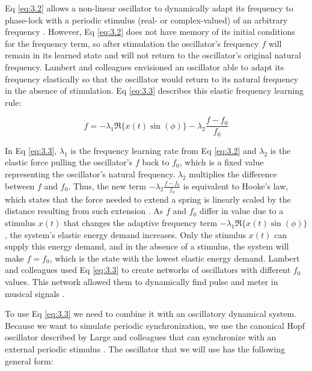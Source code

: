 \documentclass{report}
\begin{document}
Eq \eqref{eq:3.2} allows a non-linear oscillator to dynamically adapt its frequency to phase-lock with a periodic stimulus (real- or complex-valued) of an arbitrary frequency \cite{righetti2006dynamic}. However, Eq \eqref{eq:3.2} does not have memory of its initial conditions for the frequency term, so after stimulation the oscillator's frequency $f$ will remain in its learned state and will not return to the oscillator's original natural frequency. Lambert and colleagues \cite{lambert2016adaptive} envisioned an oscillator able to adapt its frequency elastically so that the oscillator would return to its natural frequency in the absence of stimulation. Eq \eqref{eq:3.3} describes this elastic frequency learning rule:

\begin{equation}
\dot{f} = -\lambda_1 \Re \{ x(t) \sin(\phi) \} - \lambda_2 \frac{f-f_0}{f_0} \label{eq:3.3}
\end{equation}

In Eq \eqref{eq:3.3}, $\lambda_1$ is the frequency learning rate from Eq \eqref{eq:3.2} and $\lambda_2$ is the elastic force pulling the oscillator's $f$ back to $f_0$, which is a fixed value representing the oscillator's natural frequency. $\lambda_2$ multiplies the difference between $f$ and $f_0$. Thus, the new term $−\lambda_2 \frac{f-f_0}{f_0}$ is equivalent to Hooke's law, which states that the force needed to extend a spring is linearly scaled by the distance resulting from such extension \cite{lambert2016adaptive}. As $f$ and $f_0$ differ in value due to a stimulus $x(t)$ that changes the adaptive frequency term $-\lambda_1 \Re \{ x(t) \sin(\phi) \}$, the system's elastic energy demand increases. Only the stimulus $x(t)$ can supply this energy demand, and in the absence of a stimulus, the system will make $f = f_0$, which is the state with the lowest elastic energy demand. Lambert and colleagues \cite{lambert2016adaptive} used Eq \eqref{eq:3.3} to create networks of oscillators with different $f_0$ values. This network allowed them to dynamically find pulse and meter in musical signals \cite{lambert2016adaptive}.

To use Eq \eqref{eq:3.3} we need to combine it with an oscillatory dynamical system. Because we want to simulate periodic synchronization, we use the canonical Hopf oscillator described by Large and colleagues that can synchronize with an external periodic stimulus \cite{large2010canonical, kim2015signal}. The oscillator that we will use has the following general form:
\end{document}
